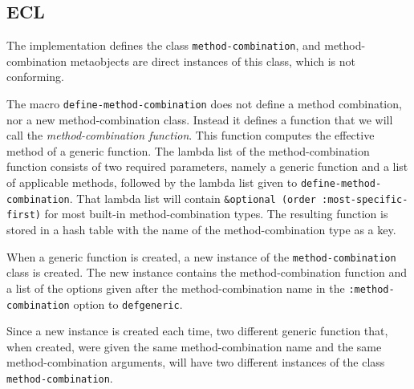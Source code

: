 \subsection{ECL}

The \ecl{} \commonlisp{} implementation defines the class
\texttt{method-combination}, and method-combination metaobjects are
direct instances of this class, which is not conforming.

The macro \texttt{define-method-combination} does not define a method
combination, nor a new method-combination class.  Instead it defines a
function that we will call the \emph{method-combination function}.
This function computes the effective method of a generic function.
The lambda list of the method-combination function consists of two
required parameters, namely a generic function and a list of
applicable methods, followed by the lambda list given to
\texttt{define-method-combination}.  That lambda list will contain
\texttt{\&optional (order :most-specific-first)} for most built-in
method-combination types.  The resulting function is stored in a hash
table with the name of the method-combination type as a key.

When a generic function is created, a new instance of the
\texttt{method-combination} class is created.  The new instance
contains the method-combination function and a list of the options
given after the method-combination name in the
\texttt{:method-combination} option to \texttt{defgeneric}.

Since a new instance is created each time, two different generic
function that, when created, were given the same method-combination
name and the same method-combination arguments, will have two
different instances of the class \texttt{method-combination}.
